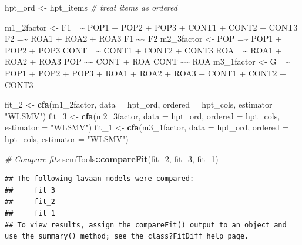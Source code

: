 \documentclass[
  10pt,
]{article}
\newenvironment{Shaded}{\begin{snugshade}}{\end{snugshade}}
\newcommand{\AttributeTok}[1]{\textcolor[rgb]{0.13,0.29,0.53}{#1}}
\newcommand{\CommentTok}[1]{\textcolor[rgb]{0.56,0.35,0.01}{\textit{#1}}}
\newcommand{\FunctionTok}[1]{\textcolor[rgb]{0.13,0.29,0.53}{\textbf{#1}}}
\newcommand{\NormalTok}[1]{#1}
\newcommand{\OtherTok}[1]{\textcolor[rgb]{0.56,0.35,0.01}{#1}}
\newcommand{\SpecialCharTok}[1]{\textcolor[rgb]{0.81,0.36,0.00}{\textbf{#1}}}
\newcommand{\StringTok}[1]{\textcolor[rgb]{0.31,0.60,0.02}{#1}}
\begin{document}
\begin{Shaded}
\begin{Highlighting}[]
\NormalTok{hpt\_ord }\OtherTok{\textless{}{-}}\NormalTok{ hpt\_items  }\CommentTok{\# treat items as ordered}

\NormalTok{m1\_2factor }\OtherTok{\textless{}{-}} \StringTok{\textquotesingle{}}
\StringTok{F1 =\textasciitilde{} POP1 + POP2 + POP3 + CONT1 + CONT2 + CONT3}
\StringTok{F2 =\textasciitilde{} ROA1 + ROA2 + ROA3}
\StringTok{F1 \textasciitilde{}\textasciitilde{} F2}
\StringTok{\textquotesingle{}}
\NormalTok{m2\_3factor }\OtherTok{\textless{}{-}} \StringTok{\textquotesingle{}}
\StringTok{POP  =\textasciitilde{} POP1 + POP2 + POP3}
\StringTok{CONT =\textasciitilde{} CONT1 + CONT2 + CONT3}
\StringTok{ROA  =\textasciitilde{} ROA1 + ROA2 + ROA3}
\StringTok{POP \textasciitilde{}\textasciitilde{} CONT + ROA}
\StringTok{CONT \textasciitilde{}\textasciitilde{} ROA}
\StringTok{\textquotesingle{}}
\NormalTok{m3\_1factor }\OtherTok{\textless{}{-}} \StringTok{\textquotesingle{}}
\StringTok{G =\textasciitilde{} POP1 + POP2 + POP3 + ROA1 + ROA2 + ROA3 + CONT1 + CONT2 + CONT3}
\StringTok{\textquotesingle{}}

\NormalTok{fit\_2 }\OtherTok{\textless{}{-}} \FunctionTok{cfa}\NormalTok{(m1\_2factor, }\AttributeTok{data =}\NormalTok{ hpt\_ord, }\AttributeTok{ordered =}\NormalTok{ hpt\_cols, }\AttributeTok{estimator =} \StringTok{"WLSMV"}\NormalTok{)}
\NormalTok{fit\_3 }\OtherTok{\textless{}{-}} \FunctionTok{cfa}\NormalTok{(m2\_3factor, }\AttributeTok{data =}\NormalTok{ hpt\_ord, }\AttributeTok{ordered =}\NormalTok{ hpt\_cols, }\AttributeTok{estimator =} \StringTok{"WLSMV"}\NormalTok{)}
\NormalTok{fit\_1 }\OtherTok{\textless{}{-}} \FunctionTok{cfa}\NormalTok{(m3\_1factor, }\AttributeTok{data =}\NormalTok{ hpt\_ord, }\AttributeTok{ordered =}\NormalTok{ hpt\_cols, }\AttributeTok{estimator =} \StringTok{"WLSMV"}\NormalTok{)}

\CommentTok{\# Compare fits}
\NormalTok{semTools}\SpecialCharTok{::}\FunctionTok{compareFit}\NormalTok{(fit\_2, fit\_3, fit\_1)}
\end{Highlighting}
\end{Shaded}

\begin{verbatim}
## The following lavaan models were compared:
##     fit_3
##     fit_2
##     fit_1
## To view results, assign the compareFit() output to an object and  use the summary() method; see the class?FitDiff help page.
\end{verbatim}
\end{document}
